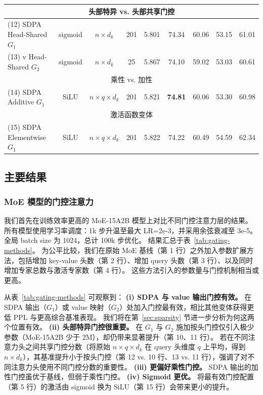 \documentclass{article} %
\begin{document}
\begin{table}[t!]
{\begin{tabular}{lccc|ccccc}
\midrule
\multicolumn{9}{c}{头部特异 vs. 头部共享门控} \\
\midrule
(12) SDPA Head-Shared $G_1$ & sigmoid & $n\times d_k$ & 201 & 5.801 & 74.34 & 60.06 &	53.15	& 61.01 \\
(13) v Head-Shared $G_2$  & sigmoid & $n\times d_k$ &25 & 5.867	&  74.10 &	59.02 &	53.03 &	60.61 \\
\midrule
\multicolumn{9}{c}{乘性 vs. 加性} \\
\midrule
(14) SDPA Additive $G_1$ & SiLU & $n\times q \times d_k$ & 201 & 5.821 & \textbf{74.81} &	60.06 &	53.30 &	60.98\\
\midrule
\multicolumn{9}{c}{激活函数变体} \\
\midrule
(15) SDPA Elementwise $G_1$ & SiLU & $n\times q \times d_k$ & 201 & 5.822 & 74.22 &	60.49 &	54.59 &	62.34\\
\bottomrule
\end{tabular}
}
\end{table}


\subsection{主要结果}
\label{sec:main_results}

\subsubsection{MoE 模型的门控注意力}
\label{sec:MoE-exp}

我们首先在训练效率更高的 MoE-15A2B 模型上对比不同门控注意力层的结果。
所有模型使用学习率调度：1k 步升温至最大 LR=2e-3，并采用余弦衰减至 3e-5。
全局 batch size 为 1024，总计 100k 步优化。
结果汇总于表~\ref{tab:gating-methods}。
为公平比较，我们在原始 MoE 基线（第 1 行）之外加入参数扩展方法，包括增加 key-value 头数（第 2 行）、增加 query 头数（第 3 行）、以及同时增加专家总数与激活专家数（第 4 行）。
这些方法引入的参数量与门控机制相当或更高。




从表~\ref{tab:gating-methods} 可观察到：
\textbf{(i) SDPA 与 value 输出门控有效。} 在 SDPA 输出（$G_1$）或 value 映射（$G_2$）处加入门控最有效，相比其他变体获得更低 PPL 与更高综合基准表现。
我们将在第~\ref{sec:sparsity} 节进一步分析为何这两个位置有效。
\textbf{(ii) 头部特异门控很重要。} 在 $G_1$ 与 $G_2$ 施加按头门控仅引入极少参数（MoE-15A2B 少于 2M），却仍带来显著提升（第 10、11 行）。
若在不同注意力头之间共享门控分数（将原始 $n \times q \times d_k$ 在 query 头维度 $q$ 上平均，得到 $n \times d_k$），其基准提升小于按头门控（第 12 vs. 10 行、13 vs. 11 行），强调了对不同注意力头使用不同门控分数的重要性。
\textbf{(iii) 更偏好乘性门控。} SDPA 输出的加性门控虽优于基线，但弱于乘性门控。
\textbf{(iv) Sigmoid 更优。} 将最有效门控配置（第 5 行）的激活由 sigmoid 换为 SiLU（第 15 行）会带来更小的提升。
\end{document}
